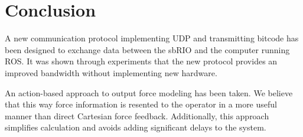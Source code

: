 \section{Conclusion}
A new communication protocol implementing UDP and transmitting bitcode has been designed to exchange data between the sbRIO and the computer running ROS. It was shown through experiments that the new protocol provides an improved bandwidth without implementing new hardware. 

An action-based approach to output force modeling has been taken. 
We believe that this way force information is resented to the operator in a more useful manner than direct Cartesian force feedback.
Additionally, this approach simplifies calculation and avoids adding significant delays to the system.
